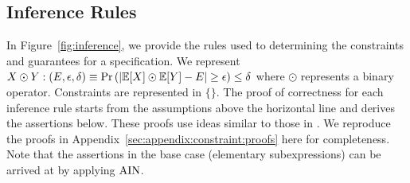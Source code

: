 \begin{subappendices}
\section{Inference Rules}
\label{sec:appendix:inference-rules}
In Figure~\ref{fig:inference}, we provide the rules used to determining the constraints and guarantees for a specification.
We represent $ 
X \odot Y : (E, \epsilon, \delta) \equiv \Pr\left(| \mathbb{E}[X] \odot \mathbb{E}[Y] - E | \geq \epsilon \right) \leq \delta
$
where $\odot$ represents a binary operator.
Constraints are represented in $\{ \}$.
The proof of correctness for each inference rule starts from the assumptions above the horizontal line and derives the assertions below. 
These proofs use ideas similar to those in \cite{bastani2019probabilistic}.
We reproduce the proofs in Appendix~\ref{sec:appendix:constraint:proofs} here for completeness.
Note that the assertions in the base case (elementary subexpressions) can be arrived at by applying $\rm{AIN}$. 


\end{subappendices}

